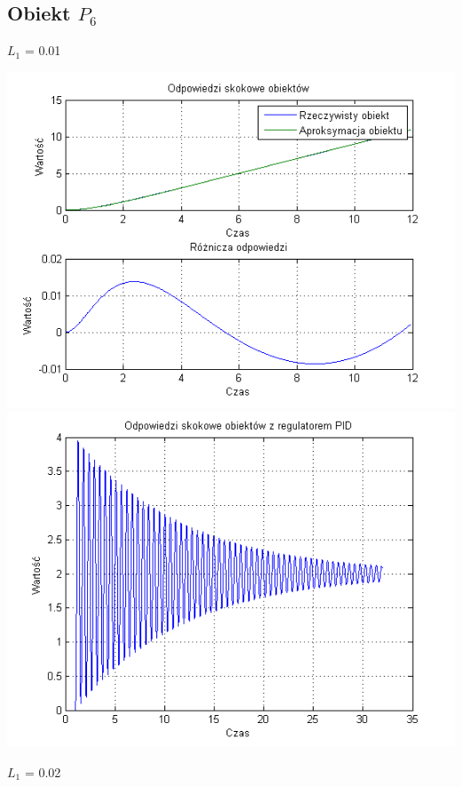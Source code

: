 \documentclass[10pt,a4paper]{article}
\begin{document}
\subsection{Obiekt $P_6$}
$L_1$ = 0.01
\begin{center}
\includegraphics[scale=1]{images/dwa/skrypt_135.png}\\
\includegraphics[scale=1]{images/dwa/skrypt_136.png}\\
\end{center}
\newpage
$L_1$ = 0.02
\end{document}
